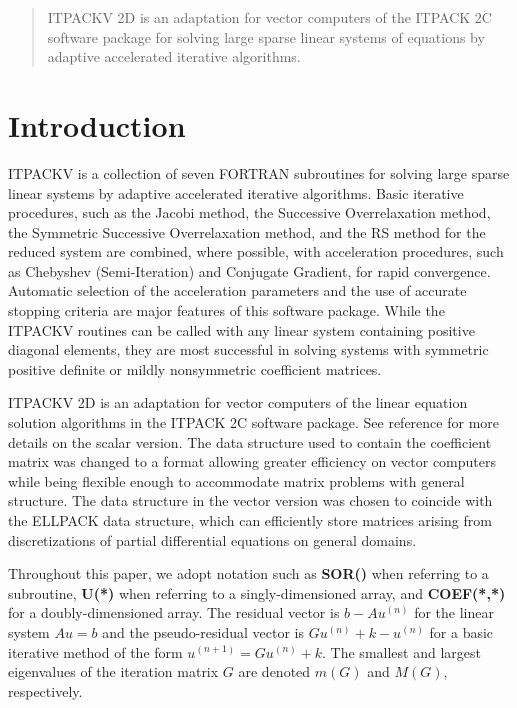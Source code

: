 \begin{abstract}

ITPACKV 2D is an adaptation for vector computers of the ITPACK 2C
software package for solving large sparse linear systems of equations by
adaptive accelerated iterative algorithms.

\end{abstract}

\section{Introduction}
\label{intro}
 
ITPACKV is a collection of seven FORTRAN subroutines for solving large
sparse linear systems by adaptive accelerated iterative algorithms.
Basic iterative procedures, such as the Jacobi method, the Successive
Overrelaxation method, the Symmetric Successive Overrelaxation method,
and the RS method for the reduced system are combined, where possible,
with acceleration procedures, such as Chebyshev (Semi-Iteration) and
Conjugate Gradient, for rapid convergence.  Automatic selection of the
acceleration parameters and the use of accurate stopping criteria are
major features of this software package.  While the ITPACKV routines
can be called with any linear system containing positive diagonal
elements, they are most successful in solving systems with symmetric
positive definite or mildly nonsymmetric coefficient matrices.

ITPACKV 2D is an adaptation for vector computers of the linear
equation solution algorithms in the ITPACK 2C software package.  See
reference \cite{6} for more details on the scalar version.  The data
structure used to contain the coefficient matrix was changed to a
format allowing greater efficiency on vector computers while being
flexible enough to accommodate matrix problems with general structure.
The data structure in the vector version was chosen to coincide with
the ELLPACK \cite{9} data structure, which can efficiently store matrices
arising from discretizations of partial differential equations on
general domains.
 
Throughout this paper, we adopt notation such as {\bf SOR()} when
referring to a subroutine, {\bf U(*)} when referring to a 
singly-dimensioned array, and {\bf COEF(*,*)} for a 
doubly-dimensioned array.  The residual vector is $b-Au^{(n)}$ for 
the linear system $Au=b$ and the pseudo-residual vector is 
$Gu^{(n)}+k-u^{(n)}$ for a basic iterative method of the form 
$u^{(n+1)}=Gu^{(n)}+k$.  The smallest and largest eigenvalues of 
the iteration matrix $G$ are denoted $m(G)$ and $M(G)$, respectively.

